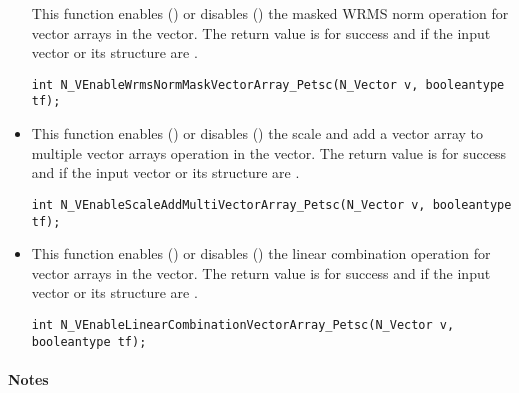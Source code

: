 \begin{itemize}
This function enables () or disables () the masked WRMS
norm operation for vector arrays in the {\petsc} vector. The return value is
 for success and  if the input vector or its  structure are
.

\verb|int N_VEnableWrmsNormMaskVectorArray_Petsc(N_Vector v, booleantype tf);|


\item {}

This function enables () or disables () the scale and
add a vector array to multiple vector arrays operation in the {\petsc} vector. The
return value is  for success and  if the input vector or its
 structure are .

\verb|int N_VEnableScaleAddMultiVectorArray_Petsc(N_Vector v, booleantype tf);|


\item {}

This function enables () or disables () the linear
combination operation for vector arrays in the {\petsc} vector. The return value
is  for success and  if the input vector or its  structure
are .

\verb|int N_VEnableLinearCombinationVectorArray_Petsc(N_Vector v, booleantype tf);|

\end{itemize}
\paragraph{\bf Notes} 
           
